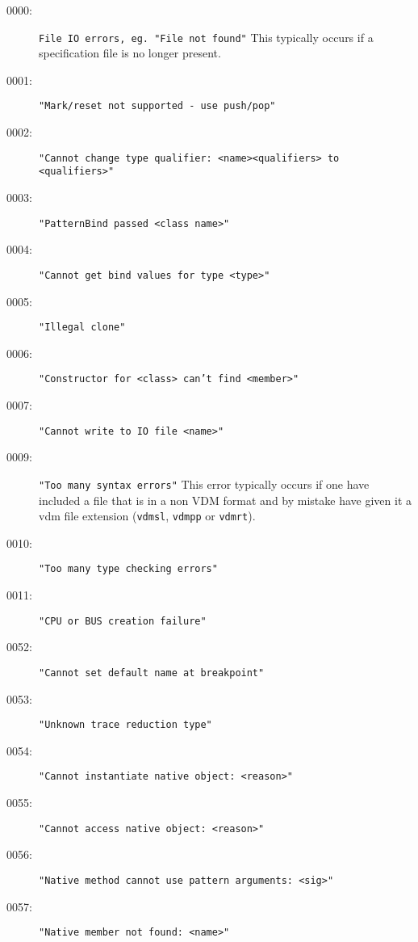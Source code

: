 %
%
%

\begin{description}
\item[0000:] \texttt{File IO errors, eg. "File not found"}  This
  typically occurs if a specification file is no longer present.
\item[0001:] \texttt{"Mark/reset not supported - use push/pop"}
\item[0002:] \texttt{"Cannot change type qualifier:\ <name><qualifiers> to <qualifiers>"}
\item[0003:] \texttt{"PatternBind passed <class name>"}
\item[0004:] \texttt{"Cannot get bind values for type <type>"}
\item[0005:] \texttt{"Illegal clone"}
\item[0006:] \texttt{"Constructor for <class> can't find <member>"}
\item[0007:] \texttt{"Cannot write to IO file <name>"}
\item[0009:] \texttt{"Too many syntax errors"}  This error typically
  occurs if one have included a file that is in a non VDM format and
  by mistake have given it a vdm file extension (\texttt{vdmsl},
  \texttt{vdmpp} or \texttt{vdmrt}).
\item[0010:] \texttt{"Too many type checking errors"}
\item[0011:] \texttt{"CPU or BUS creation failure"}
\item[0052:] \texttt{"Cannot set default name at breakpoint"}
\item[0053:] \texttt{"Unknown trace reduction type"}
\item[0054:] \texttt{"Cannot instantiate native object:\ <reason>"}
\item[0055:] \texttt{"Cannot access native object:\ <reason>"}
\item[0056:] \texttt{"Native method cannot use pattern arguments:\ <sig>"}
\item[0057:] \texttt{"Native member not found:\ <name>"}

\end{description}
